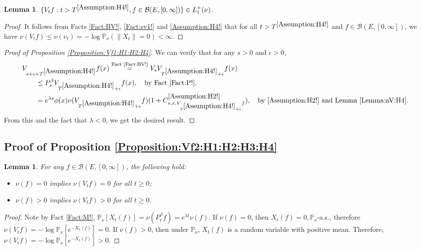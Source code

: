 \documentclass[12pt,a4paper]{amsart}
\numberwithin{equation}{section}
\theoremstyle{plain}
\newtheorem{lem}[thm]{Lemma}
\theoremstyle{definition}
\theoremstyle{remark}
\newcounter{N}
\newcounter{n}[N]
\begin{document}
\begin{lem} \label{Lemma:nV:H4} 
	$\{V_tf:t> T^{\ref{Assumption:H4!}}, f\in \mathcal B(E, [0,\infty])\}\in L_1^+(\nu)$.
\end{lem}

\begin{proof}
It follows from Facts \ref{Fact:BV!}, \ref{Fact:sv1!} and \ref{Assumption:H4!} that for  all $t> T^{\ref{Assumption:H4!}}$ and $f\in \mathcal B(E,[0,\infty])$, we have $\nu(V_t f) \leq \nu(v_t)   = - \log \mathbb P_\nu (\|X_t\| = 0)  < \infty. $
\end{proof}

\begin{proof}[{Proof of Proposition \ref{Proposition:Vf1:H1:H2:H4}}] 
We can verify that for any $s>0$ and $\epsilon>0$,
\begin{align}
\MoveEqLeft V_{s+\epsilon +T^{\ref{Assumption:H4!}}} f (x)\overset{\text{Fact \ref{Fact:BV!}}} = V_s V_{T^{\ref{Assumption:H4!}}+\epsilon} f(x)
\\&\leq P_s^\beta V_{T^{\ref{Assumption:H4!}} + \epsilon} f(x),\quad\text{by Fact \ref{Fact:P!}},
 \\&= e^{\lambda s}\phi(x) \nu( V_{T^{\ref{Assumption:H4!}} +\epsilon} f)  (1+ C^{\ref{Assumption:H2!}}_{s,x,V_{T^{\ref{Assumption:H4!}} + \epsilon} f}),\quad\text{by \ref{Assumption:H2!} and Lemma \ref{Lemma:nV:H4}}.
 \end{align}
 From this and the fact that $\lambda < 0$, we get the desired result.
\end{proof}
\subsection{Proof of Proposition \ref{Proposition:Vf2:H1:H2:H3:H4}} \label{sec:Vf2}

\begin{lem} \label{Lemma:nVn!} 
For any $f\in \mathcal B(E,[0,\infty])$, the following hold:
\begin{itemize}
\item
	$\nu(f) = 0$ implies $\nu(V_tf)=0$ for all $t\ge 0$; 
\item
	$\nu(f)>0$ implies $\nu(V_tf)>0$ for all $t\ge 0$.
\end{itemize}
\end{lem}

\begin{proof}
	Note by Fact \ref{Fact:M!}, $ \mathbb P_\nu[X_t(f)] = \nu (P_t^\beta f) = e^{\lambda t}\nu (f). $
	If $\nu(f) = 0$, then $X_t(f)=0, \mathbb P_\nu$-a.s., therefore $\nu(V_t f) = - \log \mathbb P_\nu[e^{-X_t(f)}] =0. $
	If $\nu(f) > 0$, then under $\mathbb P_\nu$, $X_t(f)$ is a random variable with positive mean.
	Therefore, $ \nu(V_tf) = - \log \mathbb P_\nu[e^{-X_t(f)}] >0$.
\end{proof}
\end{document}
